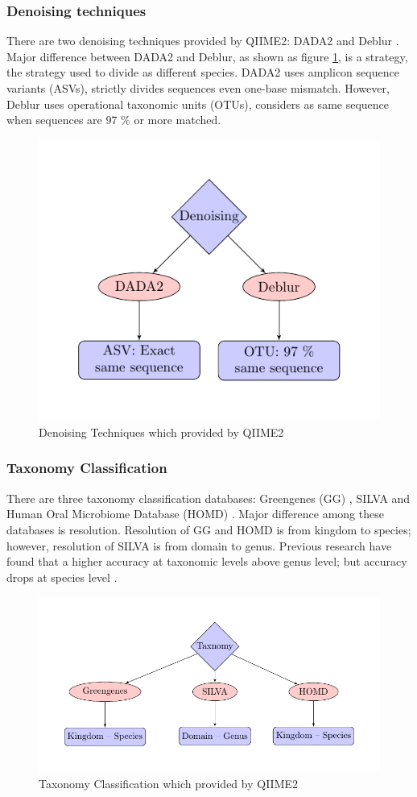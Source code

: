 \documentclass[a4paper]{article}
\begin{document}
            \subsubsection{Denoising techniques}
                There are two denoising techniques provided by QIIME2: DADA2 \cite{DADA1} and Deblur \cite{deblur1}. Major difference between DADA2 and Deblur, as shown as figure \ref{fig:denosing-workflow}, is a strategy, the strategy used to divide as different species. DADA2 uses amplicon sequence variants (ASVs), strictly divides sequences even one-base mismatch. However, Deblur uses operational taxonomic units (OTUs), considers as same sequence when sequences are 97 \% or more matched.

                \begin{figure}[p]
                    \centering
                    \includegraphics[width=0.5 \linewidth]{figures/denoising/denoising.pdf}
                    \caption{Denoising Techniques which provided by QIIME2}
                    \label{fig:denosing-workflow}
                \end{figure}

            \subsubsection{Taxonomy Classification}
                There are three taxonomy classification databases: Greengenes (GG) \cite{greengenes1}, SILVA \cite{silva1} and Human Oral Microbiome Database (HOMD) \cite{homd1}. Major difference among these databases is resolution. Resolution of GG and HOMD is from kingdom to species; however, resolution of SILVA is from domain to genus. Previous research have found that a higher accuracy at taxonomic levels above genus level; but accuracy drops at species level \cite{performance1}.

                \begin{figure}[p]
                    \centering
                    \includegraphics[width=0.5 \linewidth]{figures/taxonomy/taxonomy.pdf}
                    \caption{Taxonomy Classification which provided by QIIME2}
                    \label{fig:taxonomy-workflow}
                \end{figure}
\end{document}
